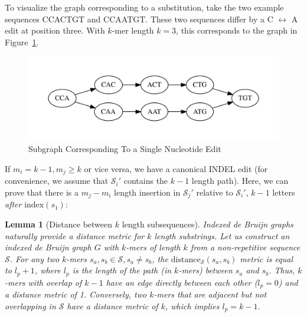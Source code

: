 \documentclass[phd]{ucbthesis}
\newtheorem{lemma}{Lemma}
\begin{document}
To visualize the graph corresponding to a substitution, take the two example sequences {CCACTGT}
and {CCAATGT}. These two sequences differ by a {C} $\leftrightarrow$ {A} edit at
position three. With $k$-mer length $k = 3$, this corresponds to the graph in Figure~\ref{fig:sne}.

\begin{figure}[h]
\begin{center}
\includegraphics[width=0.95\linewidth, clip=true, trim=0 39 0 39]{graphs/sne.pdf}
\end{center}
\caption{Subgraph Corresponding To a Single Nucleotide Edit}
\label{fig:sne}
\end{figure}

If $m_i = k - 1, m_j \ge k$ or vice versa, we have a canonical INDEL edit (for convenience, we assume
that $\mathcal{S}_i'$ contains the $k - 1$ length path). Here, we can prove that there is a $m_j - m_i$
length insertion in $\mathcal{S}_j'$ relative to $\mathcal{S}_i'$, $k - 1$ letters \emph{after}
$\text{index}(s_1)$:

\begin{lemma}[Distance between $k$ length subsequences]
\label{lem:minimum-distance}
\emph{Indexed de Bruijn} graphs naturally provide a distance metric for $k$ length substrings. Let us construct an
indexed de Bruijn graph $G$ with $k$-mers of length $k$ from a non-repetitive sequence $\mathcal{S}$.
For any two $k$-mers $s_a, s_b \in \mathcal{S}, s_a \ne s_b$, the
$\text{distance}_\mathcal{S}(s_a, s_b)$ metric is equal to $l_p + 1$, where $l_p$ is the length of the
path (in $k$-mers) between $s_a$ and $s_b$. Thus, $k$-mers with overlap of $k - 1$ have an edge
directly between each other ($l_p = 0$) and a distance metric of 1. Conversely, two $k$-mers that are
adjacent but not overlapping in $\mathcal{S}$ have a distance metric of $k$, which implies $l_p = k - 1$.
\end{lemma}
\end{document}
